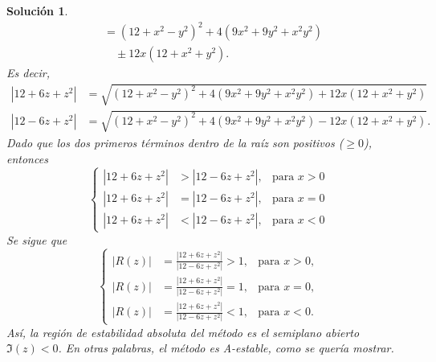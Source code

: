\documentclass[11pt]{article}
\newtheorem*{sol}{Solución}
\begin{document}
\begin{sol}
\begin{align}
    &= (12 + x^{2}-y^{2})^{2} + 4(9x^{2} + 9y^2 + x^{2}y^{2})
    \\
      &\quad \pm 12x(12 + x^{2} + y^{2})
  .\end{align}
  Es decir,
  \begin{align}
    |12 + 6z + z^{2}|
    &= \sqrt{(12 + x^{2}-y^{2})^{2} + 4(9x^{2} + 9y^2 + x^{2}y^{2})
    + 12x(12 + x^{2} + y^{2})}
    \\
    |12 - 6z + z^{2}|
    &= \sqrt{(12 + x^{2}-y^{2})^{2} + 4(9x^{2} + 9y^2 + x^{2}y^{2})
    - 12x(12 + x^{2} + y^{2})}
  .\end{align}
  Dado que los dos primeros términos dentro de la raíz son positivos
  ($\geq 0$), entonces
  \begin{equation}
    \left\{
      \begin{aligned}
          |12 + 6z + z^{2}|
          &>
        |12 - 6z + z^{2}|, & \text{para } x> 0
        \\
          |12 + 6z + z^{2}|
          &=
          |12 - 6z + z^{2}|, & \text{para } x= 0
        \\
          |12 + 6z + z^{2}|
          &<
          |12 - 6z + z^{2}|, & \text{para } x<0
      \end{aligned}
    \right.
  \end{equation}
  Se sigue que
  \begin{equation}
    \left\{
      \begin{aligned}
        |R(z)|
          &= \frac{|12 + 6z + z^{2}|}
          {|12 - 6z + z^{2}|}
        > 1, & \text{para } x> 0,
        \\
        |R(z)|
          &= \frac{|12 + 6z + z^{2}|}
          {|12 - 6z + z^{2}|}
        = 1, & \text{para } x= 0,
        \\
        |R(z)|
          &= \frac{|12 + 6z + z^{2}|}
          {|12 - 6z + z^{2}|}
        < 1, & \text{para } x< 0.
      \end{aligned}
    \right.
  \end{equation}
  Así, la región de estabilidad absoluta del método es el semiplano
  abierto $\Im(z)<0$. En otras palabras, el método es A-estable,
  como se quería mostrar.
\end{sol}
\end{document}
